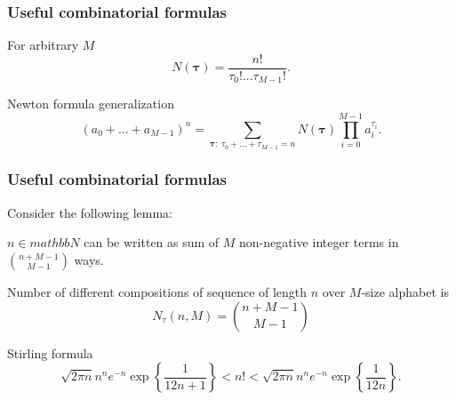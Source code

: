 \documentclass[14pt]{beamer}
\renewcommand{\vec}[1]{\ensuremath{\boldsymbol{#1}}}
\begin{document}
\begin{frame}
\frametitle{Useful combinatorial formulas}
\begin{itemize}    
\small{ 
    
    
    \item For arbitrary $M$
    \begin{equation}
    \label{eq3_7} N(\vec \tau) = \frac{n!}{\tau _0 !...\tau _{M - 1} !}.
    \end{equation}
    
    \item Newton formula generalization
    \[
    (a_0 + ... + a_{M - 1} )^n = \sum\limits_{\vec \tau:~\tau _0 + ... + \tau _{M - 1} = n} {N(\vec \tau)\prod\limits_{i = 0}^{M - 1} {a_i^{\tau _i } } } .
    \]
}
\end{itemize}
\end{frame}


\begin{frame}
\frametitle{Useful combinatorial formulas}
\begin{itemize}    
\small{
    
    \item Consider the following lemma:
    \begin{lemma} \label{num_comp} $n \in mathbb{N}$ can be written as sum of $M$ non-negative integer terms in $\binom  {n + M - 1} {M - 1} $ ways. 
    \end{lemma}

    \item Number of different compositions of sequence of length $n$ over $M$-size alphabet is
    \begin{equation}
    \label{eq3_8}
    N_\tau (n,M) = \binom {n + M - 1} {M - 1}
    \end{equation}
    
    \item Stirling formula
    \begin{equation}
    \label{eq3_9} \sqrt {2\pi n} n^ne^{ - n}\exp \left\{ {\frac{1}{12n + 1}} \right\} < n! < \sqrt {2\pi n} n^ne^{ - n}\exp \left\{ {\frac{1}{12n}} \right\}.
    \end{equation}  
 }   
\end{itemize}
\end{frame}
\end{document}

